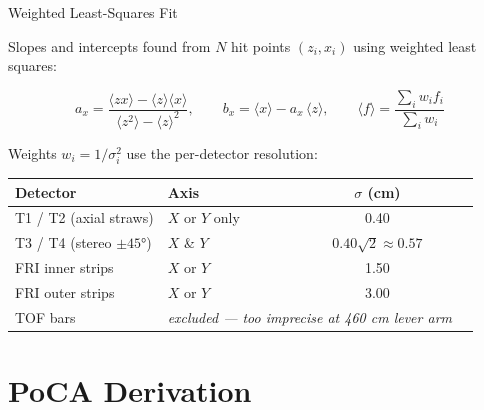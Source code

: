 \documentclass[aspectratio=169,10pt]{beamer}
\begin{document}
\begin{frame}{Weighted Least-Squares Fit}

Slopes and intercepts found from $N$ hit points $(z_i, x_i)$ using weighted least squares:

\begin{equation*}
    a_x = \frac{\langle zx \rangle - \langle z \rangle\langle x \rangle}{\langle z^2 \rangle - \langle z \rangle^2},
    \qquad
    b_x = \langle x \rangle - a_x\,\langle z \rangle,
    \qquad
    \langle f \rangle = \frac{\sum_i w_i f_i}{\sum_i w_i}
\end{equation*}

Weights $w_i = 1/\sigma_i^2$ use the per-detector resolution:

\medskip
\begin{center}
\small
\begin{tabular}{llcc}
    \toprule
    \textbf{Detector} & \textbf{Axis} & $\sigma$ \textbf{(cm)} \\
    \midrule
    T1 / T2 (axial straws)     & $X$ or $Y$ only  & 0.40 \\
    T3 / T4 (stereo $\pm45°$)  & $X$ \& $Y$       & $0.40\sqrt{2} \approx 0.57$ \\
    FRI inner strips            & $X$ or $Y$       & 1.50 \\
    FRI outer strips            & $X$ or $Y$       & 3.00 \\
    TOF bars                    & \multicolumn{2}{c}{\textit{excluded — too imprecise at 460 cm lever arm}} \\
    \bottomrule
\end{tabular}
\end{center}

\end{frame}

\section{PoCA Derivation}
\end{document}
